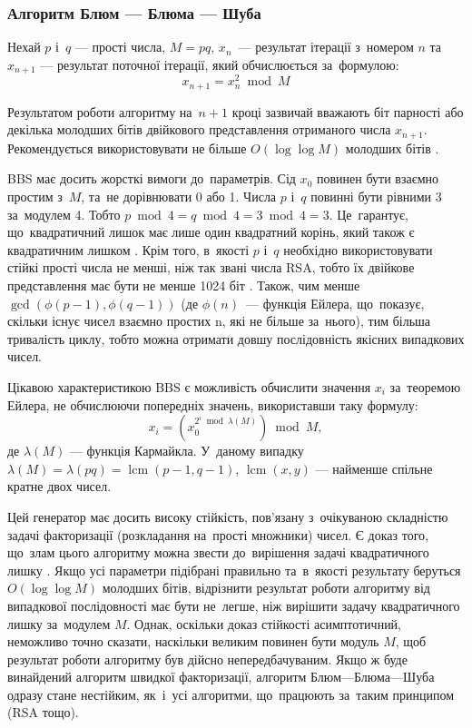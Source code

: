 \documentclass[a4paper,oneside,titlepage,14pt]{extarticle}
\DeclareMathOperator{\lcm}{lcm}
\begin{document}
			\subsubsection{Алгоритм Блюм --- Блюма --- Шуба}
				Нехай $p$ і~$q$ --- прості числа, $M = pq$, $x_n$~--- результат ітерації з~номером $n$ та~$x_{n+1}$ --- результат поточної ітерації, який обчислюється за~формулою:
				\[
					x_{n+1} = x^{2}_{n} \bmod{M}
				\]
				\par
				Результатом роботи алгоритму на~$n+1$ кроці зазвичай вважають біт парності або декілька молодших бітів двійкового представлення отриманого числа $x_{n+1}$. Рекомендується використовувати не більше $O(\log\log M)$ молодших бітів \cite{anotherlookonprovablesecurity} \cite {handbookofappliedcrypto}.\par
				BBS має досить жорсткі вимоги до~параметрів. Сід $x_0$ повинен бути взаємно простим з~$M$, та~не дорівнювати 0 або 1. Числа $p$ і~$q$ повинні бути рівними 3 за~модулем 4. Тобто $p \bmod {4} = q \bmod {4} = 3 \bmod {4} = 3$. Це~гарантує, що~квадратичний лишок має лише один квадратний корінь, який також є квадратичним лишком \cite{junodbbs}. Крім того, в~якості $p$ і~$q$ необхідно використовувати стійкі прості числа не менші, ніж так звані числа RSA, тобто їх двійкове представлення має бути не менше 1024 біт \cite{handbookofappliedcrypto}. Також, чим менше $\gcd{ \left(\phi(p-1), \phi(q-1)\right) }$ (де $\phi(n)$~--- функція Ейлера, що~показує, скільки існує чисел взаємно простих n, які не більше за~нього), тим більша тривалість циклу, тобто можна отримати довшу послідовність якісних випадкових чисел.\par
				Цікавою характеристикою BBS є можливість обчислити значення $x_i$ за~теоремою Ейлера, не обчислюючи попередніх значень, використавши таку формулу:
				\[
					x_i = \left( x^{ 2^{i} \bmod{ \lambda(M)} }_{0}\right) \bmod{M},
				\]
				де $\lambda(M)$ --- функція Кармайкла. У~даному випадку $\lambda(M) = \lambda(pq) = \lcm(p-1,q-1)$, $\lcm(x,y)$ --- найменше спільне кратне двох чисел.\par
				Цей генератор має досить високу стійкість, пов'язану з~очікуваною складністю задачі факторизації (розкладання на~прості множники) чисел. Є доказ того, що~злам цього алгоритму можна звести до~вирішення задачі квадратичного лишку \cite{asimpleunpredictableprng}. Якщо усі параметри підібрані правильно та~в~якості результату беруться $O(\log\log{M})$ молодших бітів, відрізнити результат роботи алгоритму від випадкової послідовності має бути не~легше, ніж вирішити задачу квадратичного лишку за~модулем $M$. Однак, оскільки доказ стійкості асимптотичний, неможливо точно сказати, наскільки великим повинен бути модуль $M$, щоб результат роботи алгоритму був дійсно непередбачуваним. Якщо ж буде винайдений алгоритм швидкої факторизації, алгоритм Блюм—Блюма—Шуба одразу стане нестійким, як~і~усі алгоритми, що~працюють за~таким принципом (RSA тощо).\par
\end{document}
